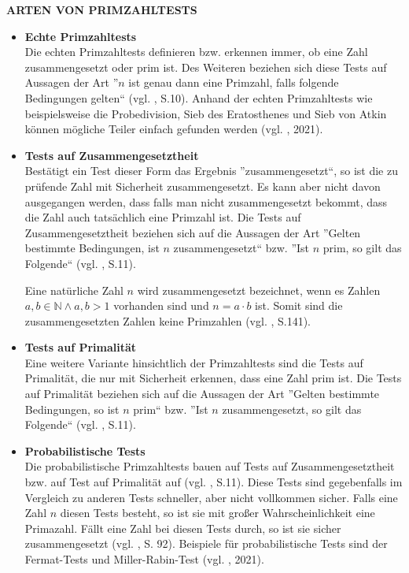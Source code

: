 \textbf{ARTEN VON PRIMZAHLTESTS}
\begin{itemize}
 \item \textbf{Echte Primzahltests}\\
    Die echten Primzahltests definieren bzw. erkennen immer,
    ob eine Zahl zusammengesetzt oder prim ist. Des Weiteren
    beziehen sich diese Tests auf Aussagen der Art ''$n$ ist
    genau dann eine Primzahl, falls folgende Bedingungen
    gelten`` (vgl. \cite{sasgabor}, S.10). Anhand der echten
    Primzahltests wie beispielsweise die Probedivision,
    Sieb des Eratosthenes und Sieb von Atkin können mögliche
    Teiler einfach gefunden werden (vgl. \cite{primzahltest}, 2021).
    
 \item \textbf{Tests auf Zusammengesetztheit}\\
    Bestätigt ein Test dieser Form das Ergebnis
    ''zusammengesetzt``, so ist die zu prüfende Zahl mit
    Sicherheit zusammengesetzt. Es kann aber nicht davon
    ausgegangen werden, dass falls man nicht zusammengesetzt
    bekommt, dass die Zahl auch tatsächlich eine Primzahl ist.
    Die Tests auf Zusammengesetztheit beziehen sich auf die
    Aussagen der Art ''Gelten bestimmte Bedingungen, ist $n$
    zusammengesetzt`` bzw. ''Ist $n$ prim, so gilt das
    Folgende`` (vgl. \cite{sasgabor}, S.11).
    
    Eine natürliche Zahl $n$ wird zusammengesetzt bezeichnet,
    wenn es Zahlen $a,b \in\mathbb{N} \land a,b > 1$ vorhanden
    sind und $n = a\cdot b$ ist. Somit sind die
    zusammengesetzten Zahlen keine Primzahlen
    (vgl. \cite{karpfingerkiechle}, S.141).
    
 \item \textbf{Tests auf Primalität}\\
    Eine weitere Variante hinsichtlich der Primzahltests
    sind die Tests auf Primalität, die nur mit Sicherheit
    erkennen, dass eine Zahl prim ist. Die Tests auf Primalität
    beziehen sich auf die Aussagen der Art ''Gelten bestimmte
    Bedingungen, so ist $n$ prim`` bzw. ''Ist $n$
    zusammengesetzt, so gilt das Folgende``
    (vgl. \cite{sasgabor}, S.11).
    
 \item \textbf{Probabilistische Tests}\\
    Die probabilistische Primzahltests bauen auf Tests auf
    Zusammengesetztheit bzw. auf Test auf Primalität auf
    (vgl. \cite{sasgabor}, S.11). Diese Tests sind gegebenfalls
    im Vergleich zu anderen Tests schneller, aber nicht
    vollkommen sicher. Falls eine Zahl $n$ diesen Tests besteht,
    so ist sie mit großer Wahrscheinlichkeit eine Primazahl.
    Fällt eine Zahl bei diesen Tests durch, so ist sie sicher
    zusammengesetzt (vgl. \cite{forster}, S. 92). Beispiele für
    probabilistische Tests sind der Fermat-Tests und
    Miller-Rabin-Test (vgl. \cite{primzahltest}, 2021).
    

\end{itemize}
